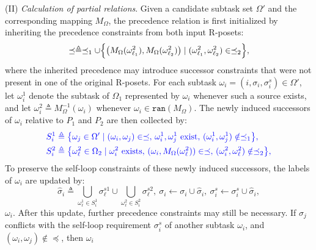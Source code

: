 (II) \emph{Calculation of partial relations}.
Given a candidate subtask set $\Omega'$ and the corresponding mapping
$M_{\Omega}$, the precedence relation is first initialized by inheriting the
precedence constraints from both input R-posets:
\begin{equation}
\label{ch04:eq:inherit_precedence}
\preceq \triangleq
\preceq_1 \cup
\Bigl\{
\bigl(M_{\Omega}(\omega_{\ell_1}^2),M_{\Omega}(\omega_{\ell_2}^2)\bigr)
\mid
(\omega_{\ell_1}^2,\omega_{\ell_2}^2)\in\preceq_2
\Bigr\},
\end{equation}
where the inherited precedence may introduce successor constraints that were not
present in one of the original R-posets. For each subtask
$\omega_i=(i,\sigma_i,\sigma_i^s)\in\Omega'$, let $\omega_i^1$ denote the
subtask of $\Omega_1$ represented by $\omega_i$ whenever such a source exists,
and let $\omega_i^2 \triangleq M_{\Omega}^{-1}(\omega_i)$ whenever
$\omega_i \in \texttt{ran}(M_{\Omega})$. The newly induced successors of
$\omega_i$ relative to $P_1$ and $P_2$ are then collected by:
\begin{equation}
\color{blue}
\label{ch04:eq:new_partial_order}
\begin{aligned}
S_i^1 &\triangleq
\bigl\{
\omega_j \in \Omega'
\mid
(\omega_i,\omega_j)\in\preceq,\,
\omega_i^1,\omega_j^1 \text{ exist},\,
(\omega_i^1,\omega_j^1)\notin\preceq_1
\bigr\},\\
S_i^2 &\triangleq
\bigl\{
\omega_\ell^2 \in \Omega_2
\mid
\omega_i^2 \text{ exists},\,
(\omega_i,M_{\Omega}(\omega_\ell^2))\in\preceq,\,
(\omega_i^2,\omega_\ell^2)\notin\preceq_2
\bigr\},
\end{aligned}
\end{equation}
To preserve the self-loop constraints of these newly induced successors, the
labels of $\omega_i$ are updated by:
\begin{equation}
\label{ch04:eq:omega_task_update}
\hat{\sigma}_i \triangleq
\bigcup_{\omega_\ell^1\in S_i^1}{\sigma_\ell^{s1}}
\cup
\bigcup_{\omega_\ell^2\in S_i^2}{\sigma_\ell^{s2}},\
\sigma_i \leftarrow \sigma_i \cup \hat{\sigma}_i,\
\sigma_i^s \leftarrow \sigma_i^s \cup \hat{\sigma}_i,
\end{equation}
 $\omega_i$.
After this update, further precedence constraints may still be necessary. If
$\sigma_j$ conflicts with the self-loop requirement $\sigma_i^s$ of another
subtask $\omega_i$, and $(\omega_i,\omega_j)\notin\preceq$, then $\omega_i$
